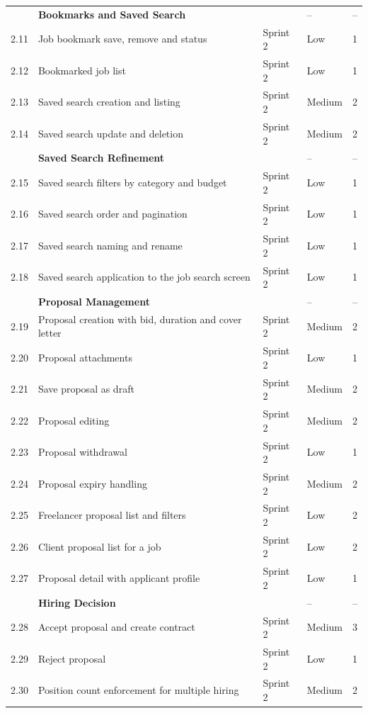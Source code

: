\begin{longtable}{|
C{1.0cm}|
L{6.9cm}|
C{1.8cm}|
C{2.1cm}|
C{2.3cm}|}
 & \textbf{Bookmarks and Saved Search} &  & -- & -- \\
2.11 & Job bookmark save, remove and status & Sprint 2 & Low & 1 \\
2.12 & Bookmarked job list & Sprint 2 & Low & 1 \\
2.13 & Saved search creation and listing & Sprint 2 & Medium & 2 \\
2.14 & Saved search update and deletion & Sprint 2 & Medium & 2 \\
\hline

 & \textbf{Saved Search Refinement} &  & -- & -- \\
2.15 & Saved search filters by category and budget & Sprint 2 & Low & 1 \\
2.16 & Saved search order and pagination & Sprint 2 & Low & 1 \\
2.17 & Saved search naming and rename & Sprint 2 & Low & 1 \\
2.18 & Saved search application to the job search screen & Sprint 2 & Low & 1 \\
\hline

 & \textbf{Proposal Management} &  & -- & -- \\
2.19 & Proposal creation with bid, duration and cover letter & Sprint 2 & Medium & 2 \\
2.20 & Proposal attachments & Sprint 2 & Low & 1 \\
2.21 & Save proposal as draft & Sprint 2 & Medium & 2 \\
2.22 & Proposal editing & Sprint 2 & Medium & 2 \\
2.23 & Proposal withdrawal & Sprint 2 & Low & 1 \\
2.24 & Proposal expiry handling & Sprint 2 & Medium & 2 \\
2.25 & Freelancer proposal list and filters & Sprint 2 & Low & 2 \\
2.26 & Client proposal list for a job & Sprint 2 & Low & 2 \\
2.27 & Proposal detail with applicant profile & Sprint 2 & Low & 1 \\
\hline

 & \textbf{Hiring Decision} &  & -- & -- \\
2.28 & Accept proposal and create contract & Sprint 2 & Medium & 3 \\
2.29 & Reject proposal & Sprint 2 & Low & 1 \\
2.30 & Position count enforcement for multiple hiring & Sprint 2 & Medium & 2 \\
\hline


\end{longtable}
